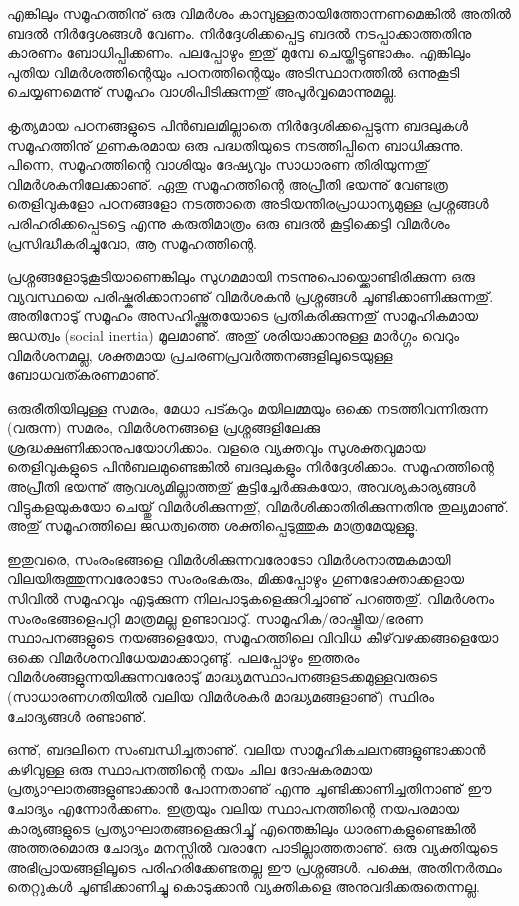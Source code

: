 എങ്കിലും സമൂഹത്തിനു് ഒരു വിമര്‍ശം കാമ്പുള്ളതായിത്തോന്നണമെങ്കില്‍ അതില്‍ ബദല്‍ നിര്‍ദ്ദേശങ്ങള്‍ വേണം.
 നിര്‍ദ്ദേശിക്കപ്പെട്ട ബദല്‍ നടപ്പാക്കാത്തതിനു കാരണം ബോധിപ്പിക്കണം. പലപ്പോഴും ഇതു് മുമ്പേ ചെയ്തിട്ടുണ്ടാകും. എങ്കിലും പുതിയ 
 വിമര്‍ശത്തിന്റെയും പഠനത്തിന്റെയും അടിസ്ഥാനത്തില്‍ ഒന്നുകൂടി ചെയ്യണമെന്നു് സമൂഹം വാശിപിടിക്കുന്നതു് അപൂര്‍വ്വമൊന്നുമല്ല.

കൃത്യമായ പഠനങ്ങളുടെ പിന്‍ബലമില്ലാതെ നിര്‍ദ്ദേശിക്കപ്പെടുന്ന ബദലുകള്‍ സമൂഹത്തിനു് ഗുണകരമായ ഒരു പദ്ധതിയുടെ
 നടത്തിപ്പിനെ ബാധിക്കുന്നു. പിന്നെ, സമൂഹത്തിന്റെ വാശിയും ദേഷ്യവും സാധാരണ തിരിയുന്നതു് വിമര്‍ശകനിലേക്കാണു്. 
 ഏതു സമൂഹത്തിന്റെ അപ്രീതി ഭയന്നു് വേണ്ടത്ര തെളിവുകളോ പഠനങ്ങളോ നടത്താതെ അടിയന്തിരപ്രാധാന്യമുള്ള പ്രശ്നങ്ങള്‍ 
 പരിഹരിക്കപ്പെടട്ടെ എന്നു കരുതിമാത്രം ഒരു ബദല്‍ കൂട്ടിക്കെട്ടി വിമര്‍ശം പ്രസിദ്ധീകരിച്ചുവോ, ആ സമൂഹത്തിന്റെ.

പ്രശ്നങ്ങളോടുകൂടിയാണെങ്കിലും സുഗമമായി നടന്നുപൊയ്ക്കൊണ്ടിരിക്കുന്ന ഒരു വ്യവസ്ഥയെ പരിഷ്കരിക്കാനാണു് വിമര്‍ശകന്‍ പ്രശ്നങ്ങള്‍ 
ചൂണ്ടിക്കാണിക്കുന്നതു്. അതിനോടു് സമൂഹം അസഹിഷ്ണുതയോടെ പ്രതികരിക്കുന്നതു് സാമൂഹികമായ ജഡത്വം (social inertia) മൂലമാണു്. 
അതു് ശരിയാക്കാനുള്ള മാര്‍ഗ്ഗം വെറും വിമര്‍ശനമല്ല, ശക്തമായ പ്രചരണപ്രവര്‍ത്തനങ്ങളിലൂടെയുള്ള ബോധവത്കരണമാണു്.

ഒരുരീതിയിലുള്ള സമരം, മേധാ പട്കറും മയിലമ്മയും ഒക്കെ നടത്തിവന്നിരുന്ന (വരുന്ന) സമരം, വിമര്‍ശനങ്ങളെ പ്രശ്നങ്ങളിലേക്കു 
ശ്രദ്ധക്ഷണിക്കാനുപയോഗിക്കാം. വളരെ വ്യക്തവും സുശക്തവുമായ തെളിവുകളുടെ പിന്‍ബലമുണ്ടെങ്കില്‍ ബദലുകളും നിര്‍ദ്ദേശിക്കാം.
 സമൂഹത്തിന്റെ അപ്രീതി ഭയന്നു് ആവശ്യമില്ലാത്തതു് കൂട്ടിച്ചേര്‍ക്കുകയോ, അവശ്യകാര്യങ്ങള്‍ വിട്ടുകളയുകയോ ചെയ്തു് വിമര്‍ശിക്കുന്നതു്, 
 വിമര്‍ശിക്കാതിരിക്കുന്നതിനു തുല്യമാണു്. അതു് സമൂഹത്തിലെ ജഡത്വത്തെ ശക്തിപ്പെടുത്തുക മാത്രമേയുള്ളൂ.

ഇതുവരെ, സംരംഭങ്ങളെ വിമര്‍ശിക്കുന്നവരോടോ വിമര്‍ശനാത്മകമായി വിലയിരുത്തുന്നവരോടോ സംരംഭകരും, മിക്കപ്പോഴും 
ഗുണഭോക്താക്കളായ സിവില്‍ സമൂഹവും എടുക്കുന്ന നിലപാടുകളെക്കുറിച്ചാണു് പറഞ്ഞതു്. വിമര്‍ശനം സംരംഭങ്ങളെപറ്റി മാത്രമല്ല ഉണ്ടാവാറു്.
 സാമൂഹിക/രാഷ്ട്രീയ/ഭരണ സ്ഥാപനങ്ങളുടെ നയങ്ങളെയോ, സമൂഹത്തിലെ വിവിധ കീഴ്‌വഴക്കങ്ങളെയോ ഒക്കെ വിമര്‍ശനവിധേയമാക്കാറുണ്ടു്. 
 പലപ്പോഴും ഇത്തരം വിമര്‍ശങ്ങളുന്നയിക്കുന്നവരോടു് മാദ്ധ്യമസ്ഥാപനങ്ങളടക്കമുള്ളവരുടെ (സാധാരണഗതിയില്‍ വലിയ വിമര്‍ശകര്‍ മാദ്ധ്യമങ്ങളാണു്)
  സ്ഥിരം ചോദ്യങ്ങള്‍ രണ്ടാണു്.

ഒന്നു്, ബദലിനെ സംബന്ധിച്ചതാണു്. വലിയ സാമൂഹികചലനങ്ങളുണ്ടാക്കാന്‍ കഴിവുള്ള ഒരു സ്ഥാപനത്തിന്റെ നയം ചില ദോഷകരമായ 
പ്രത്യാഘാതങ്ങളുണ്ടാക്കാന്‍ പോന്നതാണു് എന്നു ചൂണ്ടിക്കാണിച്ചതിനാണു് ഈ ചോദ്യം എന്നോര്‍ക്കണം. ഇത്രയും വലിയ സ്ഥാപനത്തിന്റെ
 നയപരമായ കാര്യങ്ങളുടെ പ്രത്യാഘാതങ്ങളെക്കുറിച്ചു് എന്തെങ്കിലും ധാരണകളുണ്ടെങ്കില്‍ അത്തരമൊരു ചോദ്യം മനസ്സില്‍ വരാനേ പാടില്ലാത്തതാണു്. ഒരു വ്യക്തിയുടെ അഭിപ്രായങ്ങളിലൂടെ പരിഹരിക്കേണ്ടതല്ല ഈ പ്രശ്നങ്ങള്‍. പക്ഷെ, അതിനര്‍ത്ഥം തെറ്റുകള്‍ ചൂണ്ടിക്കാണിച്ചു കൊടുക്കാന്‍ വ്യക്തികളെ അനുവദിക്കരുതെന്നല്ല.

